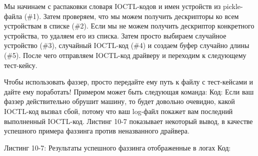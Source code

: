 \documentclass[12pt]{book}
\begin{document}






Мы начинаем с распаковки словаря IOCTL-кодов и имен устройств из pickle-файла (\#1). Затем проверяем, что мы можем получить дескрипторы ко всем устройствам в списке (\#2). Если мы не можем получить дескриптор конкретного устройства, то удаляем его из списка. Затем просто выбираем случайное устройство (\#3), случайный IOCTL-код (\#4) и создаем буфер случайно длины (\#5). После чего отправляем IOCTL-код драйверу и переходим к следующему тест-кейсу.

Чтобы использовать фаззер, просто передайте ему путь к файлу с тест-кейсами и дайте ему поработать! Примером может быть следующая команда:
Код:
Если ваш фаззер действительно обрушит машину, то будет довольно очевидно, какой IOCTL-код вызвал сбой, потому что ваш log-файл покажет вам последний выполненный IOCTL-код. Листинг 10-7 показывает некоторый вывод, в качестве успешного примера фаззинга против неназванного драйвера.

Листинг 10-7: Результаты успешного фаззинга отображенные в логах
Код:
\end{document}
